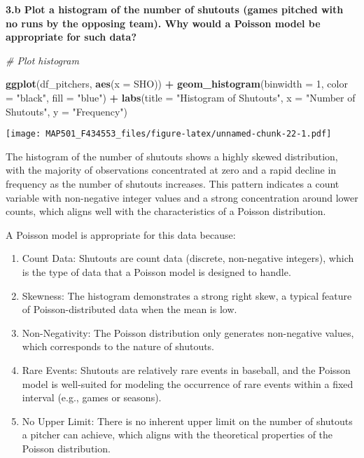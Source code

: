 \documentclass[
]{article}
\newenvironment{Shaded}{\begin{snugshade}}{\end{snugshade}}
\newcommand{\AttributeTok}[1]{\textcolor[rgb]{0.13,0.29,0.53}{#1}}
\newcommand{\CommentTok}[1]{\textcolor[rgb]{0.56,0.35,0.01}{\textit{#1}}}
\newcommand{\DecValTok}[1]{\textcolor[rgb]{0.00,0.00,0.81}{#1}}
\newcommand{\FunctionTok}[1]{\textcolor[rgb]{0.13,0.29,0.53}{\textbf{#1}}}
\newcommand{\NormalTok}[1]{#1}
\newcommand{\SpecialCharTok}[1]{\textcolor[rgb]{0.81,0.36,0.00}{\textbf{#1}}}
\newcommand{\StringTok}[1]{\textcolor[rgb]{0.31,0.60,0.02}{#1}}
\begin{document}
\textbf{3.b Plot a histogram of the number of shutouts (games pitched
with no runs by the opposing team). Why would a Poisson model be
appropriate for such data?}

\begin{Shaded}
\begin{Highlighting}[]
\CommentTok{\# Plot histogram}

\FunctionTok{ggplot}\NormalTok{(df\_pitchers, }\FunctionTok{aes}\NormalTok{(}\AttributeTok{x =}\NormalTok{ SHO)) }\SpecialCharTok{+}
  \FunctionTok{geom\_histogram}\NormalTok{(}\AttributeTok{binwidth =} \DecValTok{1}\NormalTok{, }\AttributeTok{color =} \StringTok{"black"}\NormalTok{, }\AttributeTok{fill =} \StringTok{"blue"}\NormalTok{) }\SpecialCharTok{+}
  \FunctionTok{labs}\NormalTok{(}\AttributeTok{title =} \StringTok{"Histogram of Shutouts"}\NormalTok{, }\AttributeTok{x =} \StringTok{"Number of Shutouts"}\NormalTok{, }\AttributeTok{y =} \StringTok{"Frequency"}\NormalTok{)}
\end{Highlighting}
\end{Shaded}

\texttt{[image: MAP501\_F434553\_files/figure-latex/unnamed-chunk-22-1.pdf]}

The histogram of the number of shutouts shows a highly skewed
distribution, with the majority of observations concentrated at zero and
a rapid decline in frequency as the number of shutouts increases. This
pattern indicates a count variable with non-negative integer values and
a strong concentration around lower counts, which aligns well with the
characteristics of a Poisson distribution.

A Poisson model is appropriate for this data because:

\begin{enumerate}
\def\labelenumi{\arabic{enumi}.}
\item
  Count Data: Shutouts are count data (discrete, non-negative integers),
  which is the type of data that a Poisson model is designed to handle.
\item
  Skewness: The histogram demonstrates a strong right skew, a typical
  feature of Poisson-distributed data when the mean is low.
\item
  Non-Negativity: The Poisson distribution only generates non-negative
  values, which corresponds to the nature of shutouts.
\item
  Rare Events: Shutouts are relatively rare events in baseball, and the
  Poisson model is well-suited for modeling the occurrence of rare
  events within a fixed interval (e.g., games or seasons).
\item
  No Upper Limit: There is no inherent upper limit on the number of
  shutouts a pitcher can achieve, which aligns with the theoretical
  properties of the Poisson distribution.
\end{enumerate}
\end{document}
